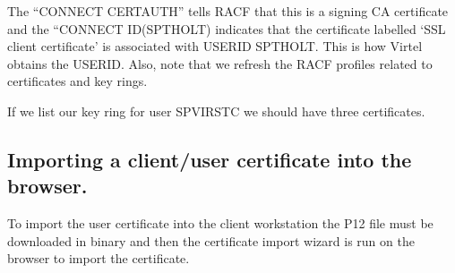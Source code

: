 \documentclass[letterpaper,10pt,english]{sphinxmanual}
\begin{document}
The “CONNECT CERTAUTH” tells RACF that this is a signing CA certificate and the “CONNECT ID(SPTHOLT) indicates that the certificate labelled ‘SSL client certificate’ is associated with USERID SPTHOLT. This is how Virtel obtains the USERID. Also, note that we refresh the RACF profiles related to certificates and key rings.

If we list our key ring for user SPVIRSTC we should have three certificates.

\begin{sphinxVerbatim}[commandchars=\\\{\}]
  
     
      
   
     
     
     
\end{sphinxVerbatim}


\subsection{Importing a client/user certificate into the browser.}
\label{\detokenize{TN202002:importing-a-client-user-certificate-into-the-browser}}
To import the user certificate into the client workstation the P12 file must be downloaded in binary and then the certificate import wizard is run on the browser to import the certificate.
\end{document}
